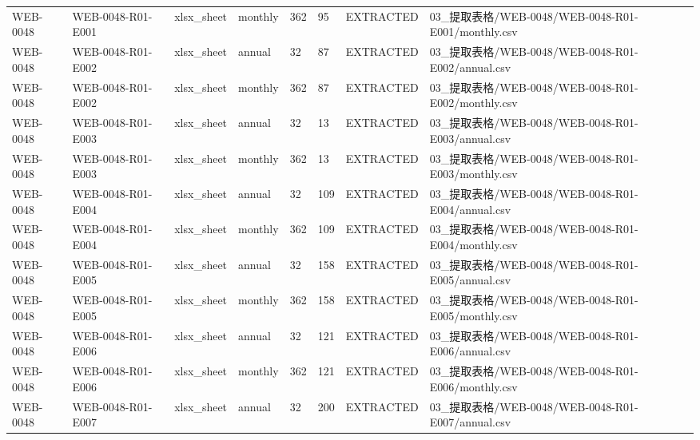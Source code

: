 \begin{landscape}
\begin{longtable}{p{1.8cm}p{2.2cm}p{3.1cm}p{4.7cm}p{1.3cm}p{1.3cm}p{3.0cm}p{5.3cm}}
WEB-0048 & WEB-0048-R01-E001 & xlsx\_\allowbreak{}sheet & monthly & 362 & 95 & EXTRACTED & 03\_\allowbreak{}提取表格/\allowbreak{}WEB-0048/\allowbreak{}WEB-0048-R01-E001/\allowbreak{}monthly.csv\\
WEB-0048 & WEB-0048-R01-E002 & xlsx\_\allowbreak{}sheet & annual & 32 & 87 & EXTRACTED & 03\_\allowbreak{}提取表格/\allowbreak{}WEB-0048/\allowbreak{}WEB-0048-R01-E002/\allowbreak{}annual.csv\\
WEB-0048 & WEB-0048-R01-E002 & xlsx\_\allowbreak{}sheet & monthly & 362 & 87 & EXTRACTED & 03\_\allowbreak{}提取表格/\allowbreak{}WEB-0048/\allowbreak{}WEB-0048-R01-E002/\allowbreak{}monthly.csv\\
WEB-0048 & WEB-0048-R01-E003 & xlsx\_\allowbreak{}sheet & annual & 32 & 13 & EXTRACTED & 03\_\allowbreak{}提取表格/\allowbreak{}WEB-0048/\allowbreak{}WEB-0048-R01-E003/\allowbreak{}annual.csv\\
WEB-0048 & WEB-0048-R01-E003 & xlsx\_\allowbreak{}sheet & monthly & 362 & 13 & EXTRACTED & 03\_\allowbreak{}提取表格/\allowbreak{}WEB-0048/\allowbreak{}WEB-0048-R01-E003/\allowbreak{}monthly.csv\\
WEB-0048 & WEB-0048-R01-E004 & xlsx\_\allowbreak{}sheet & annual & 32 & 109 & EXTRACTED & 03\_\allowbreak{}提取表格/\allowbreak{}WEB-0048/\allowbreak{}WEB-0048-R01-E004/\allowbreak{}annual.csv\\
WEB-0048 & WEB-0048-R01-E004 & xlsx\_\allowbreak{}sheet & monthly & 362 & 109 & EXTRACTED & 03\_\allowbreak{}提取表格/\allowbreak{}WEB-0048/\allowbreak{}WEB-0048-R01-E004/\allowbreak{}monthly.csv\\
WEB-0048 & WEB-0048-R01-E005 & xlsx\_\allowbreak{}sheet & annual & 32 & 158 & EXTRACTED & 03\_\allowbreak{}提取表格/\allowbreak{}WEB-0048/\allowbreak{}WEB-0048-R01-E005/\allowbreak{}annual.csv\\
WEB-0048 & WEB-0048-R01-E005 & xlsx\_\allowbreak{}sheet & monthly & 362 & 158 & EXTRACTED & 03\_\allowbreak{}提取表格/\allowbreak{}WEB-0048/\allowbreak{}WEB-0048-R01-E005/\allowbreak{}monthly.csv\\
WEB-0048 & WEB-0048-R01-E006 & xlsx\_\allowbreak{}sheet & annual & 32 & 121 & EXTRACTED & 03\_\allowbreak{}提取表格/\allowbreak{}WEB-0048/\allowbreak{}WEB-0048-R01-E006/\allowbreak{}annual.csv\\
WEB-0048 & WEB-0048-R01-E006 & xlsx\_\allowbreak{}sheet & monthly & 362 & 121 & EXTRACTED & 03\_\allowbreak{}提取表格/\allowbreak{}WEB-0048/\allowbreak{}WEB-0048-R01-E006/\allowbreak{}monthly.csv\\
WEB-0048 & WEB-0048-R01-E007 & xlsx\_\allowbreak{}sheet & annual & 32 & 200 & EXTRACTED & 03\_\allowbreak{}提取表格/\allowbreak{}WEB-0048/\allowbreak{}WEB-0048-R01-E007/\allowbreak{}annual.csv\\

\end{longtable}
\end{landscape}

